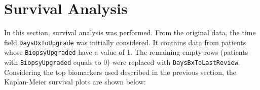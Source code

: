 \documentclass[]{article}
\begin{document}
% 
% 


\section{Survival Analysis}

\noindent In this section, survival analysis was performed. From the original data, the time field
\verb|DaysDxToUpgrade| was initially considered. It contains data from patients whose \verb|BiopsyUpgraded|
have a value of 1. The remaining empty rows (patients with \verb|BiopsyUpgraded| equals to 0) were replaced
with \verb|DaysBxToLastReview|. Considering the top biomarkers used described in the previous section, 
the Kaplan-Meier survival plots are shown below: \\
\end{document}
